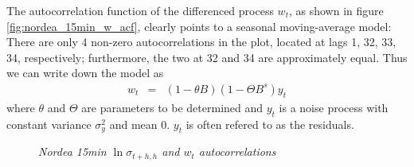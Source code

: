 The autocorrelation function of the differenced process $w_t$, as shown in
figure \ref{fig:nordea_15min_w_acf}, clearly points to a seasonal
moving-average model: There are only 4 non-zero autocorrelations in
the plot, located at lags 1, 32, 33, 34, respectively; furthermore,
the two at 32 and 34 are approximately equal. Thus we can write down
the model as
\begin{eqnarray}
  w_t &=& (1 - \theta B)(1 - \Theta B^s) y_t \label{eq:nordea_w}
\end{eqnarray}
where $\theta$ and $\Theta$ are parameters to be determined and $y_t$
is a noise process with constant variance $\sigma_y^2$ and mean
0. $y_t$ is often refered to as the residuals.
\begin{figure}[htb!]
  \centering
  \caption{\small \it Nordea 15min $\ln\sigma_{t+h, h}$ and $w_t$
    autocorrelations}
\end{figure}

